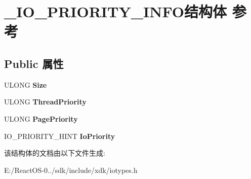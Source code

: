 \hypertarget{struct___i_o___p_r_i_o_r_i_t_y___i_n_f_o}{}\section{\+\_\+\+I\+O\+\_\+\+P\+R\+I\+O\+R\+I\+T\+Y\+\_\+\+I\+N\+F\+O结构体 参考}
\label{struct___i_o___p_r_i_o_r_i_t_y___i_n_f_o}
\subsection*{Public 属性}
\begin{DoxyCompactItemize}
\item 
\mbox{\label{struct___i_o___p_r_i_o_r_i_t_y___i_n_f_o_ad4dbbaad74e939b29cf05f2ad06208c9}} 
U\+L\+O\+NG {\bfseries Size}
\item 
\mbox{\label{struct___i_o___p_r_i_o_r_i_t_y___i_n_f_o_a3dfbcf30a93acb37be8104d169d47969}} 
U\+L\+O\+NG {\bfseries Thread\+Priority}
\item 
\mbox{\label{struct___i_o___p_r_i_o_r_i_t_y___i_n_f_o_a58950f2a2d0ec5de101833138cb2ff34}} 
U\+L\+O\+NG {\bfseries Page\+Priority}
\item 
\mbox{\label{struct___i_o___p_r_i_o_r_i_t_y___i_n_f_o_a245af14e8aab57b294e388aafce24b8d}} 
I\+O\+\_\+\+P\+R\+I\+O\+R\+I\+T\+Y\+\_\+\+H\+I\+NT {\bfseries Io\+Priority}
\end{DoxyCompactItemize}


该结构体的文档由以下文件生成\+:\begin{DoxyCompactItemize}
\item 
E\+:/\+React\+O\+S-\/0../sdk/include/xdk/iotypes.\+h\end{DoxyCompactItemize}
